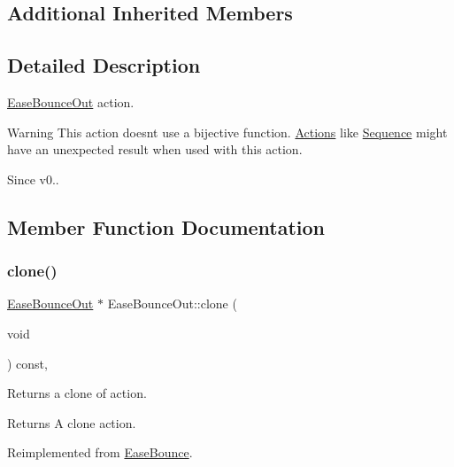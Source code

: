 \subsection*{Additional Inherited Members}


\subsection{Detailed Description}
\hyperlink{classEaseBounceOut}{Ease\+Bounce\+Out} action. 

\begin{DoxyWarning}{Warning}
This action doesn\textquotesingle{}t use a bijective function. \hyperlink{classActions}{Actions} like \hyperlink{classSequence}{Sequence} might have an unexpected result when used with this action. 
\end{DoxyWarning}
\begin{DoxySince}{Since}
v0.. 
\end{DoxySince}


\subsection{Member Function Documentation}
\mbox{\label{classEaseBounceOut_ae0c5aff0f2e8c7fcfad0d8385e1e2ec1}} 
\subsubsection{\texorpdfstring{clone()}{clone()}}
{\footnotesize\ttfamily \hyperlink{classEaseBounceOut}{Ease\+Bounce\+Out} $\ast$ Ease\+Bounce\+Out\+::clone (\begin{DoxyParamCaption}\item[{void}]{ }\end{DoxyParamCaption}) const\hspace{0.3cm}{\ttfamily [override]}, {\ttfamily [virtual]}}

Returns a clone of action.

\begin{DoxyReturn}{Returns}
A clone action. 
\end{DoxyReturn}


Reimplemented from \hyperlink{classEaseBounce_a3a39e9fa829cc40be5f2114787a98db6}{Ease\+Bounce}.

\mbox{\label{classEaseBounceOut_a9ef9260e19c5826955bba6419bdee417}} 
